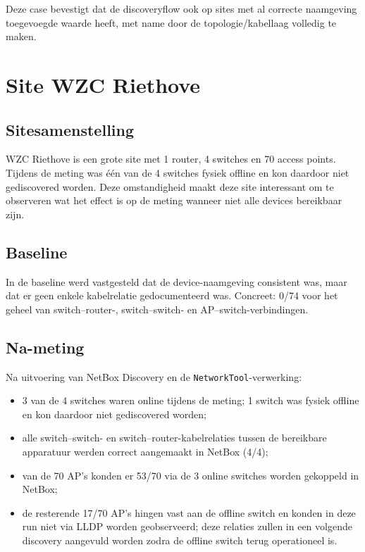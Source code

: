 Deze case bevestigt dat de discoveryflow ook op sites met al correcte naamgeving toegevoegde waarde heeft, met name door de topologie/kabellaag volledig te maken.

\section{Site WZC Riethove}
\label{sec:riethove}

\subsection{Site\-samen\-stelling}

WZC Riethove is een grote site met 1 router, 4 switches en 70 access points. Tijdens de meting was \'e\'en van de 4 switches fysiek offline en kon daardoor niet gediscovered worden. Deze omstandigheid maakt deze site interessant om te observeren wat het effect is op de meting wanneer niet alle devices bereikbaar zijn.

\subsection{Baseline}

In de baseline werd vastgesteld dat de device-naamgeving consistent was, maar dat er geen enkele kabelrelatie gedocumenteerd was. Concreet: 0/74 voor het geheel van switch--router-, switch--switch- en AP--switch-verbindingen.

\subsection{Na-meting}

Na uitvoering van NetBox Discovery en de \texttt{NetworkTool}-verwerking:

\begin{itemize}
  \item 3 van de 4 switches waren online tijdens de meting; 1 switch was fysiek offline en kon daardoor niet gediscovered worden;
  \item alle switch--switch- en switch--router-kabelrelaties tussen de bereikbare apparatuur werden correct aangemaakt in NetBox (4/4);
  \item van de 70 AP's konden er 53/70 via de 3 online switches worden gekoppeld in NetBox;
  \item de resterende 17/70 AP's hingen vast aan de offline switch en konden in deze run niet via LLDP worden geobserveerd; deze relaties zullen in een volgende discovery aangevuld worden zodra de offline switch terug operationeel is.
\end{itemize}


